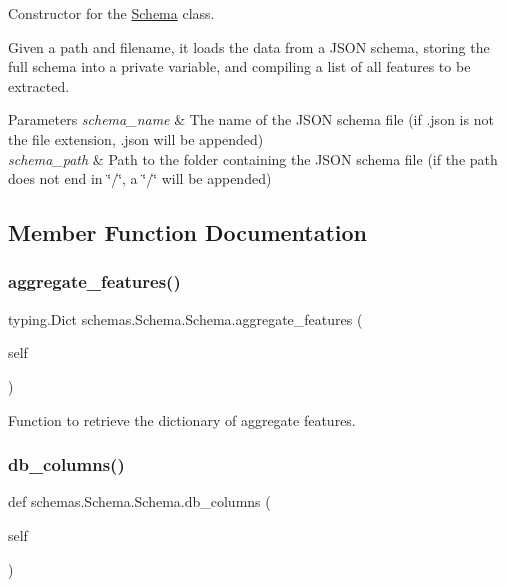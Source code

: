Constructor for the \mbox{\hyperlink{classschemas_1_1_schema_1_1_schema}{Schema}} class. 

Given a path and filename, it loads the data from a J\+S\+ON schema, storing the full schema into a private variable, and compiling a list of all features to be extracted.


\begin{DoxyParams}{Parameters}
{\em schema\+\_\+name} & The name of the J\+S\+ON schema file (if .json is not the file extension, .json will be appended) \\
\hline
{\em schema\+\_\+path} & Path to the folder containing the J\+S\+ON schema file (if the path does not end in \char`\"{}/\char`\"{}, a \char`\"{}/\char`\"{} will be appended) \\
\hline
\end{DoxyParams}


\subsection{Member Function Documentation}
\mbox{\label{classschemas_1_1_schema_1_1_schema_a65c1e410bba5f9c14aa5f90558f1313f}} 
\subsubsection{\texorpdfstring{aggregate\_features()}{aggregate\_features()}}
{\footnotesize\ttfamily  typing.\+Dict schemas.\+Schema.\+Schema.\+aggregate\+\_\+features (\begin{DoxyParamCaption}\item[{}]{self }\end{DoxyParamCaption})}



Function to retrieve the dictionary of aggregate features. 

\mbox{\label{classschemas_1_1_schema_1_1_schema_a0441b3d86b6254c0b58d69053264ae56}} 
\subsubsection{\texorpdfstring{db\_columns()}{db\_columns()}}
{\footnotesize\ttfamily def schemas.\+Schema.\+Schema.\+db\+\_\+columns (\begin{DoxyParamCaption}\item[{}]{self }\end{DoxyParamCaption})}



